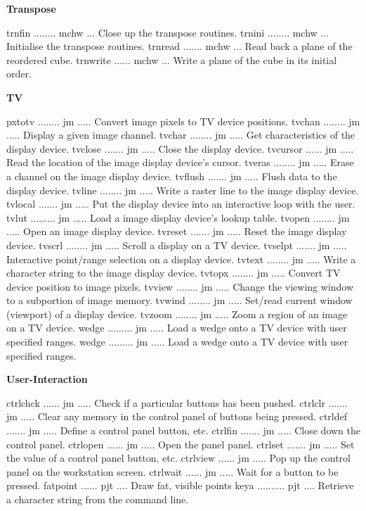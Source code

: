 \par\centerline{\bf Transpose}
{\eightpoint\begintt
trnfin ........ mchw ... Close up the transpose routines.
trnini ........ mchw ... Initialise the transpose routines.
trnread ....... mchw ... Read back a plane of the reordered cube.
trnwrite ...... mchw ... Write a plane of the cube in its initial order.
\endtt}
\par\centerline{\bf TV}
{\eightpoint\begintt
pxtotv ........ jm ..... Convert image pixels to TV device positions.
tvchan ........ jm ..... Display a given image channel.
tvchar ........ jm ..... Get characteristics of the display device.
tvclose ....... jm ..... Close the display device.
tvcursor ...... jm ..... Read the location of the image display device's cursor.
\endtt}
{\eightpoint\begintt
tveras ........ jm ..... Erase a channel on the image display device.
tvflush ....... jm ..... Flush data to the display device.
tvline ........ jm ..... Write a raster line to the image display device.
tvlocal ....... jm ..... Put the display device into an interactive loop with the user.
tvlut ......... jm ..... Load a image display device's lookup table.
\endtt}
{\eightpoint\begintt
tvopen ........ jm ..... Open an image display device.
tvreset ....... jm ..... Reset the image display device.
tvscrl ........ jm ..... Scroll a display on a TV device.
tvselpt ....... jm ..... Interactive point/range selection on a display device.
tvtext ........ jm ..... Write a character string to the image display device.
\endtt}
{\eightpoint\begintt
tvtopx ........ jm ..... Convert TV device position to image pixels.
tvview ........ jm ..... Change the viewing window to a subportion of image memory.
tvwind ........ jm ..... Set/read current window (viewport) of a display device.
tvzoom ........ jm ..... Zoom a region of an image on a TV device.
wedge ......... jm ..... Load a wedge onto a TV device with user specified ranges.
\endtt}
{\eightpoint\begintt
wedge ......... jm ..... Load a wedge onto a TV device with user specified ranges.
\endtt}
\par\centerline{\bf User-Interaction}
{\eightpoint\begintt
ctrlchck ...... jm ..... Check if a particular buttons has been pushed.
ctrlclr ....... jm ..... Clear any memory in the control panel of buttons being pressed.
ctrldef ....... jm ..... Define a control panel button, etc.
ctrlfin ....... jm ..... Close down the control panel.
ctrlopen ...... jm ..... Open the panel panel.
\endtt}
{\eightpoint\begintt
ctrlset ....... jm ..... Set the value of a control panel button, etc.
ctrlview ...... jm ..... Pop up the control panel on the workstation screen.
ctrlwait ...... jm ..... Wait for a button to be pressed.
fatpoint ...... pjt .... Draw fat, visible points
keya .......... pjt .... Retrieve a character string from the command line.
\endtt}
